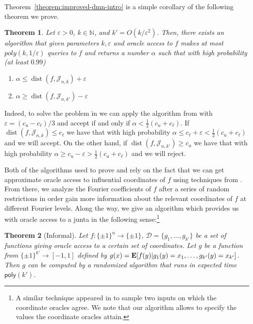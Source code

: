 \documentclass[10pt,a4paper]{article}
\providecommand{\poly}{\mathsf{poly}}
\theoremstyle{plain}
\newtheorem{theorem}{Theorem}[section]
\theoremstyle{remark}
\theoremstyle{plain}
\newcommand{\N}{\mathbb{N}}
\providecommand{\E}{}
\renewcommand{\E}{\mathop{\bf E\/}}
\newcommand{\eps}{\varepsilon}
\newcommand{\pmone}{\{\pm 1\}}
\newcommand{\dist}{\operatorname{dist}}
\newcommand{\InfluentialOracles}{\mathcal{D}}
\renewcommand{\epsilon}{\varepsilon}
\begin{document}
Theorem~\ref{theorem:improved-dmn-intro} is a simple corollary of the following theorem we prove.

\begin{theorem}\label{theorem:improved-dmn}
Let $\epsilon>0$, $k \in \N$, and $k' = O(k/\eps^2)$. Then, there exists an algorithm that given parameters $k, \eps$ and oracle access to $f$ makes at most $poly(k, 1 / \eps)$ queries to $f$ and returns a number $\alpha$ such that with high probability (at least $0.99$) 
%
\begin{enumerate}
	\item $\alpha \le \dist(f,\mathcal{J}_{n,k})+\epsilon$
	\item $\alpha \ge \dist(f,\mathcal{J}_{n,k'})-\epsilon$
\end{enumerate}
\end{theorem}

Indeed, to solve the problem in  we can apply the algorithm from  with $\eps = (c_{u}-c_{\ell})/3$ and accept if and only if $\alpha < \frac{1}{2} (c_{u} + c_{\ell})$. If $\dist(f,\mathcal{J}_{n,k}) \le c_{\ell}$ we have that with high probability $\alpha \le c_{\ell} + \eps < \frac{1}{2} (c_{u} + c_{\ell})$ and we will accept.
On the other hand, 
if $\dist(f,\mathcal{J}_{n,k'}) \ge c_{u}$ we have that with high probability $\alpha \ge c_{u} - \eps > \frac{1}{2} (c_{u} + c_{\ell})$ and we will reject.


Both of the algorithms used to prove  and  rely on the fact that we can get approximate oracle access to influential coordinates of $f$ using techniques from \cite{junta-coordinate-oracles}. From there, we analyze the Fourier coefficients of $f$ after a series of random restrictions in order gain more information about the relevant coordinates of $f$ at different Fourier levels. 
Along the way, we give an algorithm which provides us with oracle access to a junta in the following sense:\footnote{A similar technique appeared in \cite[Section 5.1]{junta-coordinate-oracles} to sample two inputs on which the coordinate oracles agree. We note that our algorithm allows to specify the values the coordinate oracles attain.}
\begin{theorem}[Informal]
\label{theorem:implicit-junta-access-informal}
	Let $f: \pmone^n \to \pmone$, $\InfluentialOracles = \{g_1, \ldots, g_{k'}\}$ be a set of functions giving oracle access to a certain set of coordinates.
	Let $g$ be a function from $\pmone^{k'} \to [-1,1]$ defined by $g(x) = \E[f(y) | g_1(y)=x_1, \ldots, g_{k'}(y)=x_{k'}]$. Then $g$ can be computed by a randomized algorithm  that runs in expected time $\poly(k')$. 
\end{theorem}
\end{document}
